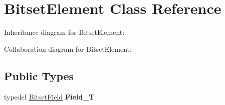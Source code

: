\hypertarget{classBitsetElement}{}\section{Bitset\+Element Class Reference}
\label{classBitsetElement}


Inheritance diagram for Bitset\+Element\+:


Collaboration diagram for Bitset\+Element\+:
\subsection*{Public Types}
\begin{DoxyCompactItemize}
\item 
typedef \hyperlink{classBitsetField}{Bitset\+Field} {\bfseries Field\+\_\+T}\hypertarget{classBitsetElement_ac6669f289b7f7793033b515911a89ff2}{}\label{classBitsetElement_ac6669f289b7f7793033b515911a89ff2}

\end{DoxyCompactItemize}
